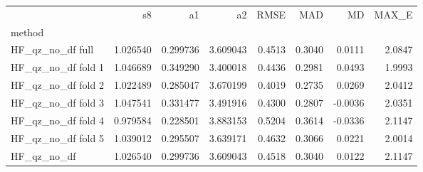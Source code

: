 \begin{tabular}{lrrrrrrr}
 & s8 & a1 & a2 & RMSE & MAD & MD & MAX_E \\
method &  &  &  &  &  &  &  \\
HF_qz_no_df full & 1.026540 & 0.299736 & 3.609043 & 0.4513 & 0.3040 & 0.0111 & 2.0847 \\
HF_qz_no_df fold 1 & 1.046689 & 0.349290 & 3.400018 & 0.4436 & 0.2981 & 0.0493 & 1.9993 \\
HF_qz_no_df fold 2 & 1.022489 & 0.285047 & 3.670199 & 0.4019 & 0.2735 & 0.0269 & 2.0412 \\
HF_qz_no_df fold 3 & 1.047541 & 0.331477 & 3.491916 & 0.4300 & 0.2807 & -0.0036 & 2.0351 \\
HF_qz_no_df fold 4 & 0.979584 & 0.228501 & 3.883153 & 0.5204 & 0.3614 & -0.0336 & 2.1147 \\
HF_qz_no_df fold 5 & 1.039012 & 0.295507 & 3.639171 & 0.4632 & 0.3066 & 0.0221 & 2.0014 \\
HF_qz_no_df & 1.026540 & 0.299736 & 3.609043 & 0.4518 & 0.3040 & 0.0122 & 2.1147 \\
\end{tabular}
